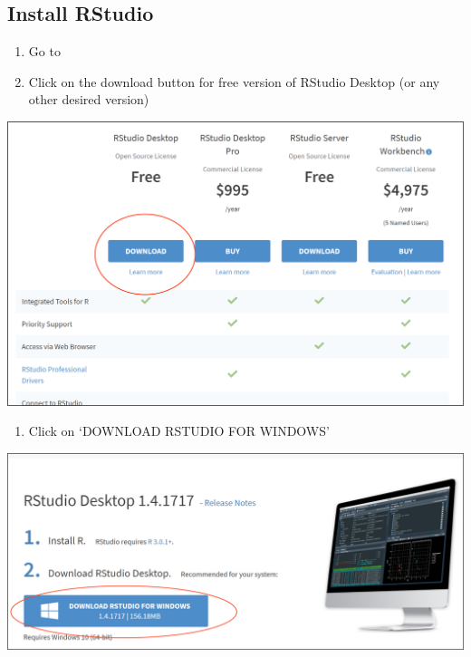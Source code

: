 \documentclass[
]{book}
\providecommand{\tightlist}{%
  \setlength{\itemsep}{0pt}\setlength{\parskip}{0pt}}
\begin{document}
\hypertarget{install-rstudio}{%
\subsection{Install RStudio}\label{install-rstudio}}

\begin{enumerate}
\def\labelenumi{\arabic{enumi}.}
\tightlist
\item
  Go to \href{https://www.rstudio.com/products/rstudio/download/}{}\\
\item
  Click on the download button for free version of RStudio Desktop (or any other desired version)
\end{enumerate}

\includegraphics{tutorial_screenshots/download_rstudio.png}

\begin{enumerate}
\def\labelenumi{\arabic{enumi}.}
\setcounter{enumi}{2}
\tightlist
\item
  Click on `DOWNLOAD RSTUDIO FOR WINDOWS'
\end{enumerate}

\includegraphics{tutorial_screenshots/download_rstudio2.png}
\end{document}
